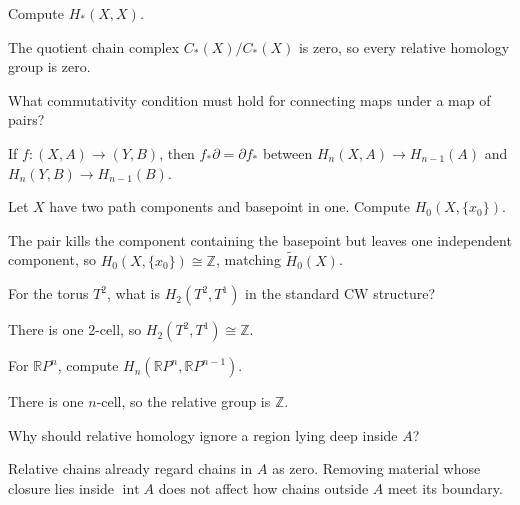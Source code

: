 \begin{problem}\label{prob:viii19-16}
Compute \(H_*(X,X)\).
\end{problem}
\begin{solution}
The quotient chain complex \(C_*(X)/C_*(X)\) is zero, so every relative homology group is zero.
\end{solution}

\begin{problem}\label{prob:viii19-17}
What commutativity condition must hold for connecting maps under a map of pairs?
\end{problem}
\begin{solution}
If \(f:(X,A)\to(Y,B)\), then \(f_*\partial=\partial f_*\) between \(H_n(X,A)\to H_{n-1}(A)\) and \(H_n(Y,B)\to H_{n-1}(B)\).
\end{solution}

\begin{problem}\label{prob:viii19-18}
Let \(X\) have two path components and basepoint in one. Compute \(H_0(X,\{x_0\})\).
\end{problem}
\begin{solution}
The pair kills the component containing the basepoint but leaves one independent component, so \(H_0(X,\{x_0\})\cong\mathbb Z\), matching \(\widetilde H_0(X)\).
\end{solution}

\begin{problem}\label{prob:viii19-19}
For the torus \(T^2\), what is \(H_2(T^2,T^1)\) in the standard CW structure?
\end{problem}
\begin{solution}
There is one 2-cell, so \(H_2(T^2,T^1)\cong\mathbb Z\).
\end{solution}

\begin{problem}\label{prob:viii19-20}
For \(\mathbb RP^n\), compute \(H_n(\mathbb RP^n,\mathbb RP^{n-1})\).
\end{problem}
\begin{solution}
There is one \(n\)-cell, so the relative group is \(\mathbb Z\).
\end{solution}

\begin{problem}\label{prob:viii19-21}
Why should relative homology ignore a region lying deep inside \(A\)?
\end{problem}
\begin{solution}
Relative chains already regard chains in \(A\) as zero. Removing material whose closure lies inside \(\operatorname{int}A\) does not affect how chains outside \(A\) meet its boundary.
\end{solution}

